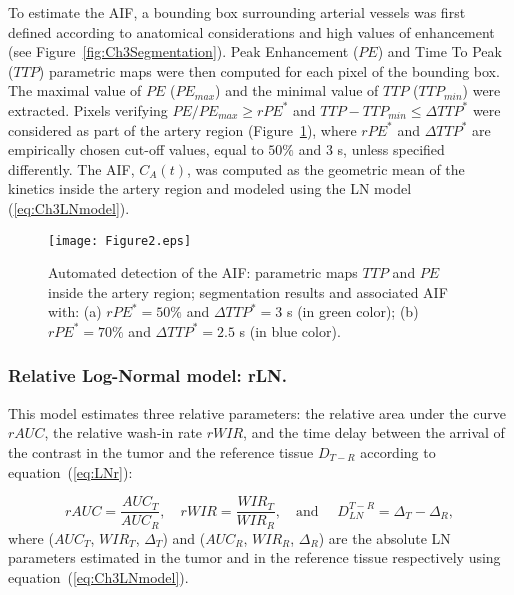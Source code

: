 To estimate the AIF, a bounding box surrounding arterial vessels was first defined according to anatomical considerations and high values of enhancement (see Figure~\ref{fig:Ch3Segmentation}).
Peak Enhancement ($PE$) and Time To Peak ($TTP$) parametric maps were then computed for each pixel of the bounding box.  The maximal value of $PE$ ($PE_{max}$) and the minimal value of $TTP$ ($TTP_{min}$) were extracted. Pixels verifying $PE/PE_{max}\geq rPE^{*}$ and $TTP-TTP_{min}\leq\Delta TTP^{*}$ were considered as part of the artery region (Figure~\ref{fig:AIF}), where $rPE^{*}$ and $\Delta TTP^{*}$ are empirically chosen cut-off values, equal to $50\%$ and 3 s, unless specified differently.
The AIF, $C_A(t)$, was computed as the geometric mean of the kinetics inside the artery region and modeled using the LN model  (\ref{eq:Ch3LNmodel}).  

\begin{figure}[ht]
  \centering
  \texttt{[image: Figure2.eps]}
  \caption{Automated detection of the AIF: parametric maps $TTP$ and $PE$ inside the artery region; segmentation results and associated AIF with: (a) $rPE^{*}=50\%$ and $\Delta TTP^{*}=3$ s  (in green color); (b) $rPE^{*}=70\%$ and $\Delta TTP^{*}=2.5$ s  (in blue color).}
\label{fig:AIF}
\end{figure}

\subsubsection{Relative Log-Normal model: \textbf{rLN}.}  
This model estimates three relative parameters: the relative area under the curve $rAUC$, the relative wash-in rate $rWIR$, and the time delay between the arrival of the contrast in the tumor and the reference tissue $D_{T-R }$ according to equation~(\ref{eq:LNr}):

\begin{equation}
rAUC = \frac {AUC_T} {AUC_{R}}, \quad rWIR = \frac{WIR_T}{WIR_{R}}, \quad \textrm{and } \quad D^{T-R}_{LN} = \Delta_T - \Delta_{R},
\label{eq:LNr}
\end{equation}
where ($AUC_T$, $WIR_T$, $\Delta_T$) and  ($AUC_{R}$, $WIR_{R}$, $\Delta_{R}$) are the absolute LN parameters estimated in the tumor and in the reference tissue respectively using equation~(\ref{eq:Ch3LNmodel}).

